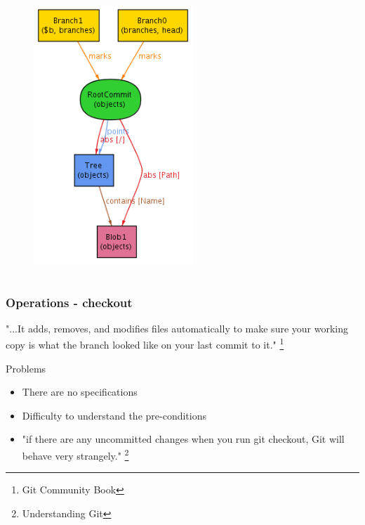 \documentclass{beamer}
\begin{document}
\begin{frame}[fragile]
\begin{columns}[c]
\begin{figure}
         \includegraphics[width=0.90\textwidth]{images/branch2.png}
      \end{figure}
   \end{columns}
\end{frame}

\begin{frame}[fragile]
   \frametitle{Operations - checkout}
	 "...It adds, removes, and modifies files automatically to make 
	 sure your working copy is what the branch looked like on your last commit to it."	 
	 \footnote{Git Community Book}
	\pause
   \begin{block}{Problems}
      \begin{itemize}
         \item There are no specifications
	 \item Difficulty to understand the pre-conditions
	 \item "if there are any uncommitted changes when you run git checkout,
	 Git will behave very strangely." \footnote{Understanding Git}
	\end{itemize}
   \end{block}
\end{frame}
\end{document}
